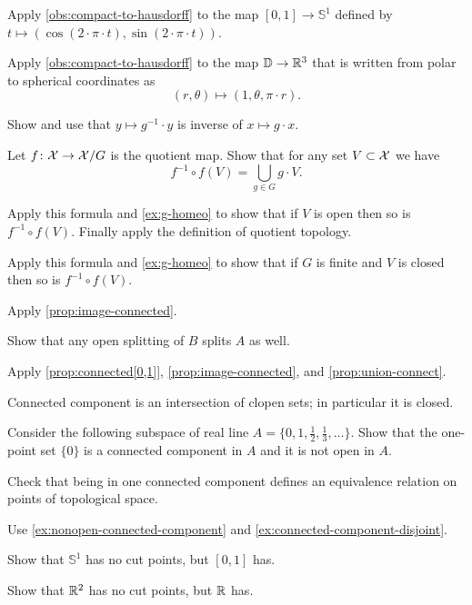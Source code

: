 \begin{multicols}{2}
Apply \ref{obs:compact-to-hausdorff} to the map $[0,1]\to \mathbb{S}^1$ defined by $t\mapsto (\cos (2\cdot\pi\cdot t), \sin(2\cdot\pi\cdot t))$.

Apply \ref{obs:compact-to-hausdorff} to the map $\mathbb{D}\to \mathbb{R}^3$ that is written from polar to spherical coordinates as  
\[(r,\theta)\mapsto (1, \theta, \pi\cdot r).\]

Show and use that $y\mapsto g^{-1}\cdot y$ is inverse of $x\mapsto g\cdot x$.

\parbf{\ref{ex:quotient-map}}
Let $f\colon\mathcal{X}\to \mathcal{X}/G$ is the quotient map.
Show that for any set $V\subset \mathcal{X}$ we have
\[f^{-1}\circ f(V)=\bigcup_{g\in G}g\cdot V.\]

Apply this formula and \ref{ex:g-homeo} to show that if $V$ is open then so is $f^{-1}\circ f(V)$.
Finally apply the definition of quotient topology.

Apply this formula and \ref{ex:g-homeo} to show that if $G$ is finite and $V$ is closed then so is $f^{-1}\circ f(V)$.

 Apply \ref{prop:image-connected}.

Show that any open splitting of $B$ splits $A$ as well.

Apply \ref{prop:connected[0,1]}, \ref{prop:image-connected}, and \ref{prop:union-connect}.

Connected component is an intersection of clopen sets; in particular it is closed.

Consider the following subspace of real line $A=\{0,1,\tfrac12,\tfrac13,\dots\}$.
Show that the one-point set $\{0\}$ is a connected component in $A$ and it is not open in $A$. 

Check that being in one connected component defines an equivalence relation on points of topological space.

Use \ref{ex:nonopen-connected-component} and \ref{ex:connected-component-disjoint}.

Show that $\mathbb{S}^1$ has no cut points, but $[0,1]$ has.

Show that $\mathbb{R}^2$ has no cut points, but $\mathbb{R}$ has.


\end{multicols}
